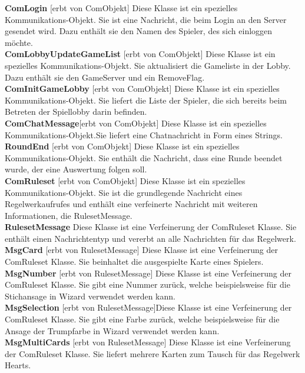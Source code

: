 \documentclass{article}
\begin{document}
		\textbf{ComLogin} [erbt von ComObjekt] Diese Klasse ist ein spezielles Kommunikations-Objekt. Sie ist eine Nachricht, die beim Login an den Server gesendet wird. Dazu enthält sie den Namen des Spieler, des sich einloggen möchte.\\
		\textbf{ComLobbyUpdateGameList} [erbt von ComObjekt] Diese Klasse ist ein spezielles Kommunikations-Objekt. Sie aktualisiert die Gameliste in der Lobby. Dazu enthält sie den GameServer und ein RemoveFlag.\\
		\textbf{ComInitGameLobby} [erbt von ComObjekt] Diese Klasse ist ein spezielles Kommunikations-Objekt. Sie liefert die Liste der Spieler, die sich bereits beim Betreten der Spiellobby darin befinden. \\
		\textbf{ComChatMessage}[erbt von ComObjekt] Diese Klasse ist ein spezielles Kommunikations-Objekt.Sie liefert eine Chatnachricht in Form eines Strings.\\
		\textbf{RoundEnd} [erbt von ComObjekt] Diese Klasse ist ein spezielles Kommunikations-Objekt. Sie enthält die Nachricht, dass eine Runde beendet wurde, der eine Auswertung folgen soll. \\
		\textbf{ComRuleset} [erbt von ComObjekt] Diese Klasse ist ein spezielles Kommunikations-Objekt. Sie ist die grundlegende Nachricht eines Regelwerkaufrufes und enthält eine verfeinerte Nachricht mit weiteren Informationen, die RulesetMessage. \\
		\textbf{RulesetMessage} Diese Klasse ist eine Verfeinerung der ComRuleset Klasse. Sie enthält einen Nachrichtentyp und vererbt an alle Nachrichten für das Regelwerk.\\
		\textbf{MsgCard} [erbt von RulesetMessage] Diese Klasse ist eine Verfeinerung der ComRuleset Klasse. Sie beinhaltet die ausgespielte Karte eines Spielers.\\
		\textbf{MsgNumber} [erbt von RulesetMessage] Diese Klasse ist eine Verfeinerung der ComRuleset Klasse. Sie gibt eine Nummer zurück, welche beispielsweise für die Stichansage in Wizard verwendet werden kann.\\
		\textbf{MsgSelection} [erbt von RulesetMessage]Diese Klasse ist eine Verfeinerung der ComRuleset Klasse. Sie gibt eine Farbe zurück, welche beispielsweise für die Ansage der Trumpfarbe in Wizard verwendet werden kann.\\
		\textbf{MsgMultiCards} [erbt von RulesetMessage] Diese Klasse ist eine Verfeinerung der ComRuleset Klasse. Sie liefert mehrere Karten zum Tausch für das Regelwerk Hearts. \\
\end{document}
